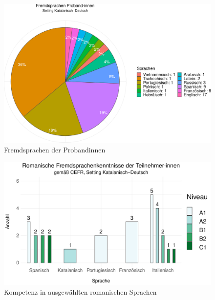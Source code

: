 \begin{figure}
	\includegraphics[width=\textwidth]{Figures/EingangsFB/ggplot_sprachen_CatDe_probanden}
	\caption{Fremdsprachen der Proband{\textperiodcentered}innen}
    \label{K6:fig:Fremdspr-Prob-CatDe}
\end{figure}




\begin{figure}
    \includegraphics[width=\textwidth]{Figures/EingangsFB/ggplot_Fremdsprachen-CEFR-CatDe}
	\caption{Kompetenz in ausgewählten romanischen Sprachen\label{K6:fig:CEFR-Niveau-CatDe}}
\end{figure}




